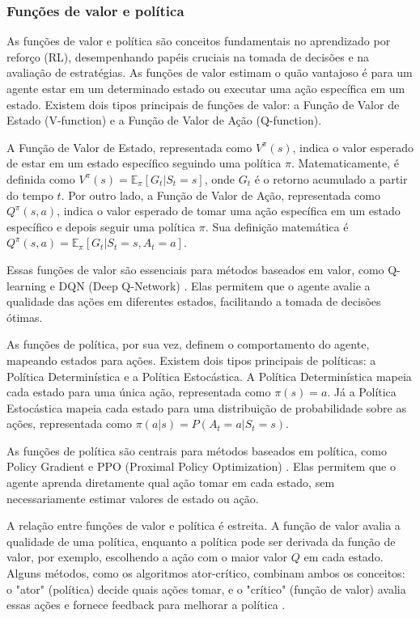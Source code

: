 \subsubsection{Funções de valor e política}
\label{subsubsec:valor_politica}

As funções de valor e política são conceitos fundamentais no aprendizado por reforço (RL), desempenhando papéis cruciais na tomada de decisões e na avaliação de estratégias. As funções de valor estimam o quão vantajoso é para um agente estar em um determinado estado ou executar uma ação específica em um estado. Existem dois tipos principais de funções de valor: a Função de Valor de Estado (V-function) e a Função de Valor de Ação (Q-function).

A Função de Valor de Estado, representada como \( V^\pi(s) \), indica o valor esperado de estar em um estado específico seguindo uma política \(\pi\). Matematicamente, é definida como \( V^\pi(s) = \mathbb{E}_\pi[G_t | S_t = s] \), onde \( G_t \) é o retorno acumulado a partir do tempo \( t \). Por outro lado, a Função de Valor de Ação, representada como \( Q^\pi(s,a) \), indica o valor esperado de tomar uma ação específica em um estado específico e depois seguir uma política \(\pi\). Sua definição matemática é \( Q^\pi(s,a) = \mathbb{E}_\pi[G_t | S_t = s, A_t = a] \).

Essas funções de valor são essenciais para métodos baseados em valor, como Q-learning e DQN (Deep Q-Network) \cite{0fe19b1631b60807bffb7757865b184d797c3016}. Elas permitem que o agente avalie a qualidade das ações em diferentes estados, facilitando a tomada de decisões ótimas.

As funções de política, por sua vez, definem o comportamento do agente, mapeando estados para ações. Existem dois tipos principais de políticas: a Política Determinística e a Política Estocástica. A Política Determinística mapeia cada estado para uma única ação, representada como \(\pi(s) = a\). Já a Política Estocástica mapeia cada estado para uma distribuição de probabilidade sobre as ações, representada como \(\pi(a|s) = P(A_t = a | S_t = s)\).

As funções de política são centrais para métodos baseados em política, como Policy Gradient e PPO (Proximal Policy Optimization) \cite{0fe19b1631b60807bffb7757865b184d797c3016}. Elas permitem que o agente aprenda diretamente qual ação tomar em cada estado, sem necessariamente estimar valores de estado ou ação.

A relação entre funções de valor e política é estreita. A função de valor avalia a qualidade de uma política, enquanto a política pode ser derivada da função de valor, por exemplo, escolhendo a ação com o maior valor \( Q \) em cada estado. Alguns métodos, como os algoritmos ator-crítico, combinam ambos os conceitos: o "ator" (política) decide quais ações tomar, e o "crítico" (função de valor) avalia essas ações e fornece feedback para melhorar a política \cite{0fe19b1631b60807bffb7757865b184d797c3016}.

